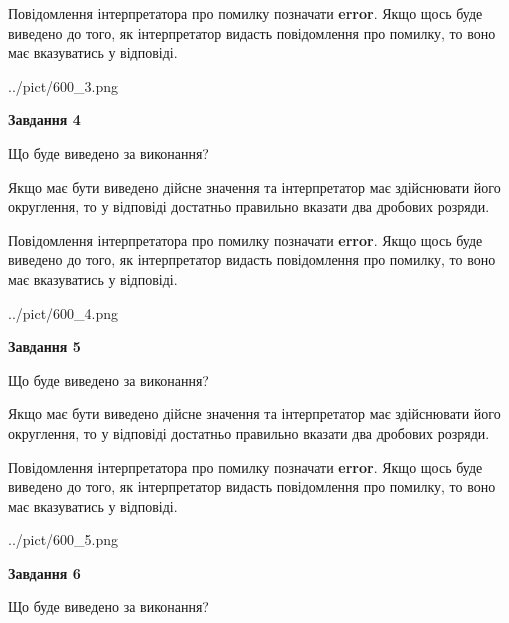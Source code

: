 \documentclass[12pt, ukrainian]{article}
\begin{document}
{\begin {Large}
Повідомлення інтерпретатора про помилку позначати \textbf{error}.
Якщо щось буде виведено до того, як інтерпретатор видасть повідомлення про помилку, 
то воно має вказуватись у відповіді. \par

\begin{center}
	{../pict/600_3.png}
\end{center}
\newpage

{\begin {center}\textbf{Завдання 4}\end {center}}\par
Що буде виведено за виконання? \par

Якщо має бути виведено дійсне значення та інтерпретатор має здійснювати його округлення, 
то у відповіді достатньо правильно вказати два дробових розряди.

Повідомлення інтерпретатора про помилку позначати \textbf{error}.
Якщо щось буде виведено до того, як інтерпретатор видасть повідомлення про помилку, 
то воно має вказуватись у відповіді. \par

\begin{center}
	{../pict/600_4.png}
\end{center}
\newpage

{\begin {center}\textbf{Завдання 5}\end {center}}\par
Що буде виведено за виконання? \par

Якщо має бути виведено дійсне значення та інтерпретатор має здійснювати його округлення, 
то у відповіді достатньо правильно вказати два дробових розряди.

Повідомлення інтерпретатора про помилку позначати \textbf{error}.
Якщо щось буде виведено до того, як інтерпретатор видасть повідомлення про помилку, 
то воно має вказуватись у відповіді. \par

\begin{center}
	{../pict/600_5.png}
\end{center}
\newpage

{\begin {center}\textbf{Завдання 6}\end {center}}\par
Що буде виведено за виконання? \par


\end{Large}}
\end{document}
